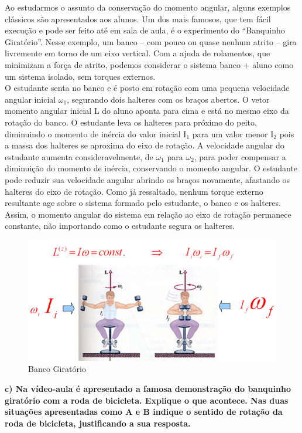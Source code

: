 Ao estudarmos o assunto da conservação do momento angular, alguns exemplos clássicos são apresentados aos alunos. Um dos mais famosos, que tem fácil execução e pode ser feito até em sala de aula, é o experimento do “Banquinho Giratório”. Nesse exemplo, um banco – com pouco ou quase nenhum atrito – gira livremente em torno de um eixo vertical. Com a ajuda de rolamentos, que minimizam a força de atrito, podemos considerar o sistema banco + aluno como um sistema isolado, sem torques externos.\\

O estudante senta no banco e é posto em rotação com uma pequena velocidade angular inicial $\omega _1$, segurando dois halteres com os braços abertos. O vetor momento angular inicial L do aluno aponta para cima e está no mesmo eixo da rotação do banco. O estudante leva os halteres para próximo do peito, diminuindo o momento de inércia do valor inicial I$_1$ para um valor menor I$_2$ pois a massa dos halteres se aproxima do eixo de rotação. A velocidade angular do estudante aumenta consideravelmente, de $\omega _1$ para $\omega _2$, para poder compensar a diminuição do momento de inércia, conservando o momento angular. O estudante pode reduzir sua velocidade angular abrindo os braços novamente, afastando os halteres do eixo de rotação. Como já ressaltado, nenhum torque externo resultante age sobre o sistema formado pelo estudante, o banco e os halteres. Assim, o momento angular do sistema em relação ao eixo de rotação permanece constante, não importando como o estudante segura os halteres.

\begin{figure}[H]
  \centering
  \includegraphics[scale=1]{images/i4.png}
  \caption{Banco Giratório}
\end{figure}

\textbf{c) Na vídeo-aula é apresentado a famosa demonstração do banquinho giratório com a roda de bicicleta. Explique o que acontece. Nas duas situações apresentadas como A e B indique o sentido de rotação da roda de bicicleta, justificando a sua resposta.}\\

